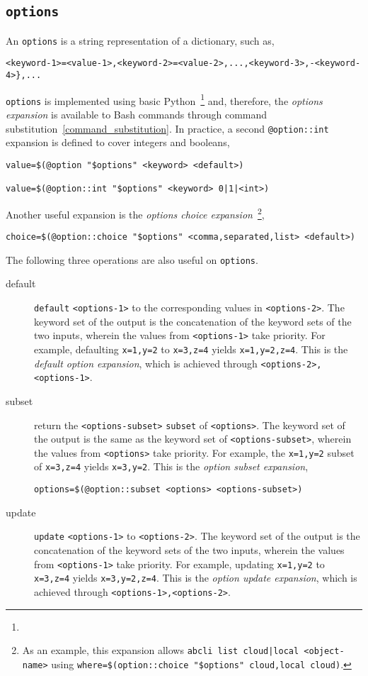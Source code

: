 \subsection{\texttt{options}}\label{options}

An \texttt{options} is a string representation of a dictionary, such as,
%
\begin{verbatim}
<keyword-1>=<value-1>,<keyword-2>=<value-2>,...,<keyword-3>,-<keyword-4>},...
\end{verbatim}
%
\texttt{options} is implemented using basic Python~\footnote{} and, therefore, the \emph{options expansion} is available to Bash commands through command substitution~\ref{command_substitution}. In practice, a second \texttt{@option::int} expansion is defined to cover integers and booleans,
%
\begin{verbatim}
value=$(@option "$options" <keyword> <default>)

value=$(@option::int "$options" <keyword> 0|1|<int>)
\end{verbatim}
%
Another useful expansion is the \emph{options choice expansion}~\footnote{
As an example, this expansion allows \texttt{abcli list cloud|local <object-name>} using \texttt{where=\$(option::choice "\$options" cloud,local cloud)}.
},
%
\begin{verbatim}
choice=$(@option::choice "$options" <comma,separated,list> <default>)
\end{verbatim}
%
The following three operations are also useful on \texttt{options}.
%
\begin{description}
%
\item[default]{\texttt{default} \texttt{<options-1>} to the corresponding values in \texttt{<options-2>}. The keyword set of the output is the concatenation of the keyword sets of the two inputs, wherein the values from \texttt{<options-1>} take priority. For example, defaulting \texttt{x=1,y=2} to \texttt{x=3,z=4} yields \texttt{x=1,y=2,z=4}. This is the \emph{default option expansion}, which is achieved through \texttt{<options-2>,<options-1>}.}
%
\item[subset]{return the \texttt{<options-subset>} \texttt{subset} of \texttt{<options>}. The keyword set of the output is the same as the keyword set of \texttt{<options-subset>}, wherein the values from \texttt{<options>} take priority. For example, the \texttt{x=1,y=2} subset of \texttt{x=3,z=4} yields \texttt{x=3,y=2}. This is the \emph{option subset expansion},
\begin{verbatim}
options=$(@option::subset <options> <options-subset>)
\end{verbatim}
}
%
\item[update]{\texttt{update} \texttt{<options-1>} to \texttt{<options-2>}. The keyword set of the output is the concatenation of the keyword sets of the two inputs, wherein the values from \texttt{<options-1>} take priority. For example, updating \texttt{x=1,y=2} to \texttt{x=3,z=4} yields \texttt{x=3,y=2,z=4}. This is the \emph{option update expansion}, which is achieved through \texttt{<options-1>,<options-2>}.}
%
\end{description}
